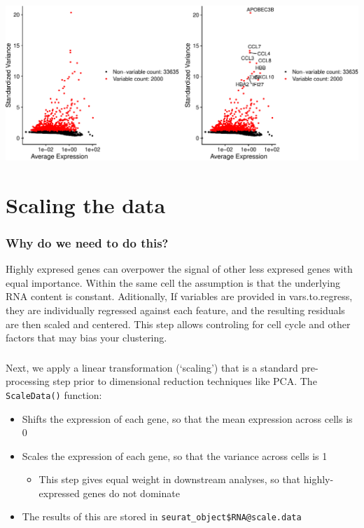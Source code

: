 \documentclass[
]{book}
\providecommand{\tightlist}{%
  \setlength{\itemsep}{0pt}\setlength{\parskip}{0pt}}
\begin{document}
\includegraphics{scRNAseqInR_ABACBS_2024_Doco_files/figure-latex/var_features-1.pdf}

\hypertarget{scaling-the-data}{%
\section{Scaling the data}\label{scaling-the-data}}

\hypertarget{why-do-we-need-to-do-this-3}{%
\subsubsection*{Why do we need to do this?}\label{why-do-we-need-to-do-this-3}}

Highly expresed genes can overpower the signal of other less expresed genes with equal importance. Within the same cell the assumption is that the underlying RNA content is constant. Aditionally, If variables are provided in vars.to.regress, they are individually regressed against each feature, and the resulting residuals are then scaled and centered.
This step allows controling for cell cycle and other factors that may bias your clustering.

\hypertarget{section-5}{%
\subsubsection*{}\label{section-5}}

Next, we apply a linear transformation (`scaling') that is a standard pre-processing step prior to dimensional reduction techniques like PCA. The \texttt{ScaleData()} function:

\begin{itemize}
\tightlist
\item
  Shifts the expression of each gene, so that the mean expression across cells is 0
\item
  Scales the expression of each gene, so that the variance across cells is 1

  \begin{itemize}
  \tightlist
  \item
    This step gives equal weight in downstream analyses, so that highly-expressed genes do not dominate
  \end{itemize}
\item
  The results of this are stored in \texttt{seurat\_object\$RNA@scale.data}
\end{itemize}
\end{document}
